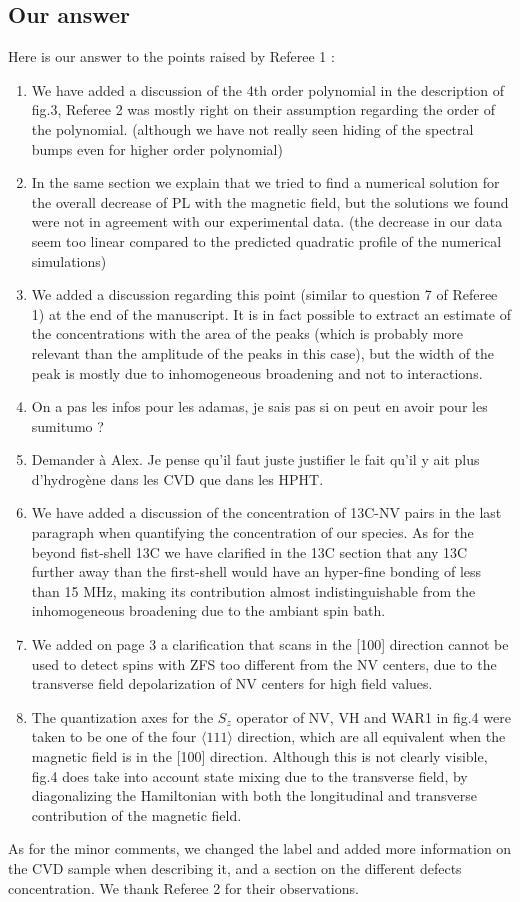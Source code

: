 \documentclass{article}
\begin{document}
\subsection*{Our answer}
Here is our answer to the points raised by Referee 1 :
\begin{enumerate}
\item We have added a discussion of the 4th order polynomial in the description of fig.3, Referee 2 was mostly right on their assumption regarding the order of the polynomial. (although we have not really seen hiding of the spectral bumps even for higher order polynomial)
\item In the same section we explain that we tried to find a numerical solution for the overall decrease of PL with the magnetic field, but the solutions we found were not in agreement with our experimental data. (the decrease in our data seem too linear compared to the predicted quadratic profile of the numerical simulations)
\item We added a discussion regarding this point (similar to question 7 of Referee 1) at the end of the manuscript. It is in fact possible to extract an estimate of the concentrations with the area of the peaks (which is probably more relevant than the amplitude of the peaks in this case), but the width of the peak is mostly due to inhomogeneous broadening and not to interactions.
\item On a pas les infos pour les adamas, je sais pas si on peut en avoir pour les sumitumo ?
\item Demander à Alex. Je pense qu'il faut juste justifier le fait qu'il y ait plus d'hydrogène dans les CVD que dans les HPHT.
\item We have added a discussion of the concentration of 13C-NV pairs in the last paragraph when quantifying the concentration of our species. As for the beyond fist-shell 13C we have clarified in the 13C section that any 13C further away than the first-shell would have an hyper-fine bonding of less than 15 MHz, making its contribution almost indistinguishable from the inhomogeneous broadening due to the ambiant spin bath.
\item We added on page 3 a clarification that scans in the [100] direction cannot be used to detect spins with ZFS too different from the NV centers, due to the transverse field depolarization of NV centers for high field values.
\item The quantization axes for the $S_z$ operator of NV, VH and WAR1 in fig.4 were taken to be one of the four $\langle 111 \rangle$ direction, which are all equivalent when the magnetic field is in the [100] direction. Although this is not clearly visible, fig.4 does take into account state mixing due to the transverse field, by diagonalizing the Hamiltonian with both the longitudinal and transverse contribution of the magnetic field. 
\end{enumerate}


As for the minor comments, we changed the label and added more information on the CVD sample when describing it, and a section on the different defects concentration. We thank Referee 2 for their observations.
\end{document}
